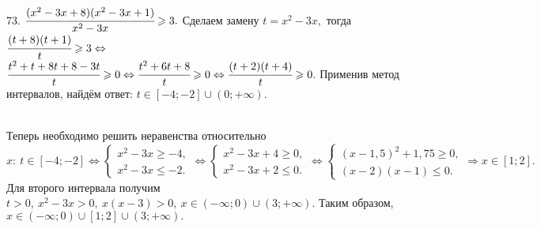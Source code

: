 73. $\cfrac{(x^2-3x+8)(x^2-3x+1)}{x^2-3x}\geqslant3.$ Сделаем замену $t=x^2-3x,$ тогда $\cfrac{(t+8)(t+1)}{t}\geqslant3\Leftrightarrow$\\$
\cfrac{t^2+t+8t+8-3t}{t}\geqslant0\Leftrightarrow \cfrac{t^2+6t+8}{t}\geqslant0\Leftrightarrow \cfrac{(t+2)(t+4)}{t}\geqslant0.$ Применив метод интервалов, найдём ответ: $t\in[-4;-2]\cup(0;+\infty).$
\begin{figure}[ht!]
\end{figure}\\
Теперь необходимо решить неравенства относительно $x:\ t\in[-4;-2]\Leftrightarrow\begin{cases} x^2-3x\geqslant-4,\\ x^2-3x\leqslant-2.\end{cases}
\Leftrightarrow\begin{cases} x^2-3x+4\geqslant0,\\ x^2-3x+2\leqslant0.\end{cases}\Leftrightarrow
\begin{cases} (x-1,5)^2+1,75\geqslant0,\\ (x-2)(x-1)\leqslant0.\end{cases}\Rightarrow x\in[1;2].$ Для второго интервала получим $t>0,\ x^2-3x>0,\ x(x-3)>0,\
x\in(-\infty;0)\cup(3;+\infty).$ Таким образом,  $x\in(-\infty;0)\cup[1;2]\cup(3;+\infty).$\\

